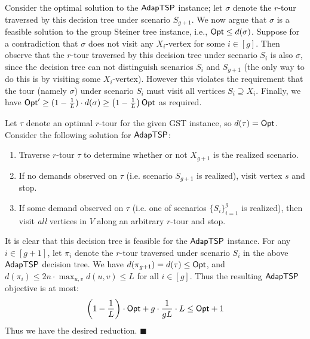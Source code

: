 \documentclass[11pt]{article}
\def\opt{{\sf Opt}\xspace}
\def\stsp{\ensuremath{{\sf AdapTSP}}\xspace}
\def\mgs{{\sf GST}\xspace}
\newenvironment{pf}{

\noindent{\bf Proof:}} {\hfill$\blacksquare$


}
\begin{document}
\begin{pf}
\noindent {\bf (A) $\left( 1-\frac1L\right) \opt \, \le \, \opt'$.} Consider the optimal solution to the \stsp
instance; let $\sigma$ denote the $r$-tour traversed by this decision tree under scenario $S_{g+1}$. We now argue that
$\sigma$ is a feasible solution to the group Steiner  tree instance, i.e., $\opt\le d(\sigma)$. Suppose for a
contradiction that $\sigma$ does not visit any $X_i$-vertex for some $i\in[g]$. Then observe that the $r$-tour
traversed by this decision tree under scenario $S_i$ is also $\sigma$, since the  decision tree can not distinguish scenarios
$S_i$ and $S_{g+1}$ (the only way to do this is by visiting some $X_i$-vertex). However this violates the requirement
that the tour (namely $\sigma$) under scenario $S_i$ must visit all vertices $S_i\supseteq X_i$. Finally, we have
$\opt'\ge (1-\frac1L)\cdot d(\sigma)\ge \left( 1-\frac1L\right) \opt$ as required. 

\noindent {\bf (B) $\opt'\le \opt+1$.} Let $\tau$ denote an optimal
  $r$-tour for the given \mgs instance, so $d(\tau)=\opt$. Consider the
  following solution for \stsp:
  \begin{enumerate}
  \item Traverse $r$-tour $\tau$ to determine whether or not $X_{g+1}$ is
    the realized scenario.
  \item If no demands observed on $\tau$ (i.e. scenario $S_{g+1}$ is realized), visit vertex $s$ and stop.
  \item If some demand observed on $\tau$ (i.e. one of scenarios $\{S_i\}_{i=1}^g$ is realized), then visit {\em all} vertices in $V$ along an
    arbitrary $r$-tour and stop.
   \end{enumerate}
It is clear that this  decision tree is feasible for the \stsp instance.  For any $i\in [g+1]$, let $\pi_i$ denote the
$r$-tour traversed under scenario $S_i$ in the above \stsp  decision tree. We have
  $d(\pi_{g+1})=d(\tau)\le \opt$, and
  $d(\pi_{i})\le 2n\cdot \max_{u,v} d(u,v) \le L$ for all $i\in [g]$. Thus the resulting \stsp objective is
  at most:
  $$\left(1-\frac1L\right)\cdot \opt + g\cdot \frac1{gL}\cdot L \le
  \opt + 1$$
  Thus we have the desired reduction.
\end{pf}
\end{document}
